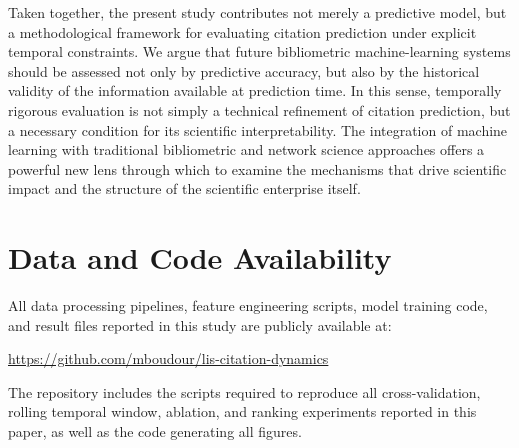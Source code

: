 \documentclass[11pt,a4paper]{article}
\begin{document}
Taken together, the present study contributes not merely a predictive model, but a methodological framework for evaluating citation prediction under explicit temporal constraints. We argue that future bibliometric machine-learning systems should be assessed not only by predictive accuracy, but also by the historical validity of the information available at prediction time. In this sense, temporally rigorous evaluation is not simply a technical refinement of citation prediction, but a necessary condition for its scientific interpretability. The integration of machine learning with traditional bibliometric and network science approaches offers a powerful new lens through which to examine the mechanisms that drive scientific impact and the structure of the scientific enterprise itself.

\section*{Data and Code Availability}
All data processing pipelines, feature engineering scripts, model training
code, and result files reported in this study are publicly available at:
\begin{center}
\url{https://github.com/mboudour/lis-citation-dynamics}
\end{center}
The repository includes the scripts required to reproduce all
cross-validation, rolling temporal window, ablation, and ranking
experiments reported in this paper, as well as the code generating
all figures.



\end{document}

